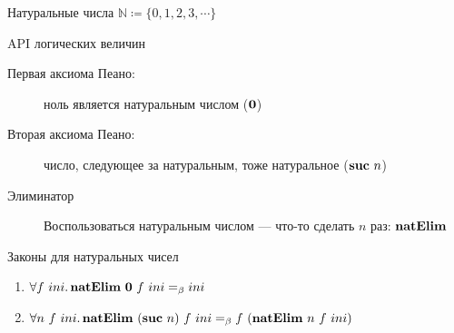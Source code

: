     \begin{frame}[fragile]{Натуральные числа $\mathbb{N} \coloneqq \{0, 1, 2, 3, \cdots\}$}
        \pause
        \begin{block}{API логических величин}
            \begin{description}
                \item[Первая аксиома Пеано:] ноль является натуральным числом ($\mathbf{0}$)
                \item[Вторая аксиома Пеано:] число, следующее за натуральным, тоже
                натуральное ($\mathbf{suc} ~ n$)
                \item[Элиминатор] Воспользоваться натуральным числом --- что-то сделать $n$ раз: $\mathbf{natElim}$
            \end{description}
        \end{block}
        \pause
        \begin{block}{Законы для натуральных чисел}
            \begin{enumerate}
                \item $\forall f~ini\ldotp \mathbf{natElim} ~ \mathbf{0} ~ f ~ ini =_\beta ini$
                \item $\forall n~f~ini\ldotp \mathbf{natElim} ~ (\mathbf{suc} ~ n) ~ f ~ ini =_\beta f ~ (\mathbf{natElim} ~ n ~ f ~ ini)$
            \end{enumerate}
        \end{block}
    \end{frame}

